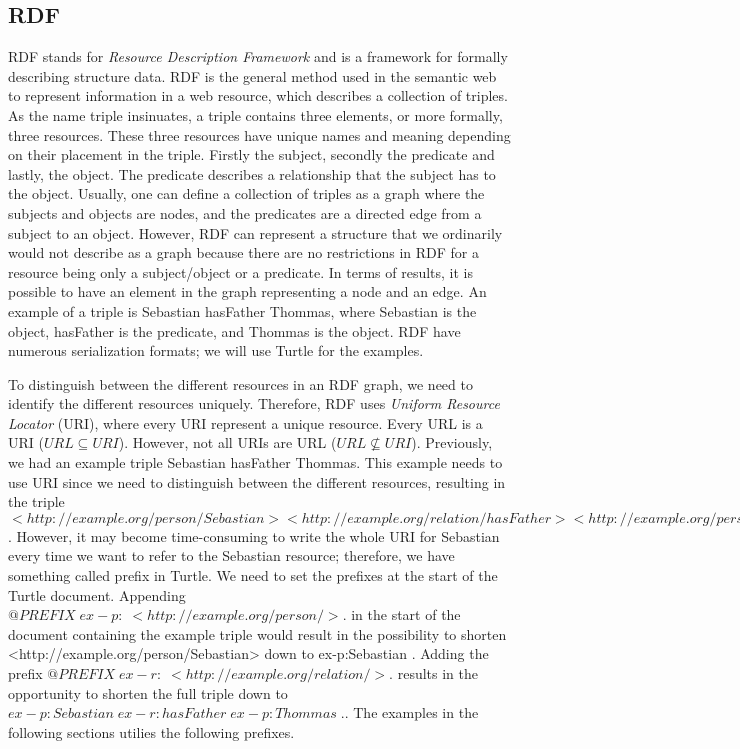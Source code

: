 \subsection{RDF}
\label{RDF}
RDF stands for \emph{Resource Description Framework} and is a framework for formally describing structure data. RDF is the general method used in the semantic web to represent information in a web resource, which describes a collection of triples. As the name triple insinuates, a triple contains three elements, or more formally, three resources. These three resources have unique names and meaning depending on their placement in the triple. Firstly the subject, secondly the predicate and lastly, the object. The predicate describes a relationship that the subject has to the object. Usually, one can define a collection of triples as a graph where the subjects and objects are nodes, and the predicates are a directed edge from a subject to an object. However, RDF can represent a structure that we ordinarily would not describe as a graph because there are no restrictions in RDF for a resource being only a subject/object or a predicate. In terms of results, it is possible to have an element in the graph representing a node and an edge. An example of a triple is Sebastian hasFather Thommas, where Sebastian is the object, hasFather is the predicate, and Thommas is the object. RDF have numerous serialization formats; we will use Turtle for the examples.  

\para
To distinguish between the different resources in an RDF graph, we need to identify the different resources uniquely. Therefore, RDF uses \emph{Uniform Resource Locator} (URI), where every URI represent a unique resource. Every URL is a URI ($URL\subseteq URI$). However, not all URIs are URL ($URL\nsubseteq URI$).  Previously, we had an example triple Sebastian hasFather Thommas. This example needs to use URI since we need to distinguish between the different resources, resulting in the triple $<http://example.org/person/Sebastian> <http://example.org/relation/hasFather> <http://example.org/person/Thommas> .$ . However, it may become time-consuming to write the whole URI for Sebastian every time we want to refer to the Sebastian resource; therefore, we have something called prefix in Turtle. We need to set the prefixes at the start of the Turtle document. Appending $@PREFIX\; ex-p:\; <http://example.org/person/>.$ in the start of the document containing the example triple would result in the possibility to shorten <http://example.org/person/Sebastian> down to ex-p:Sebastian . Adding the prefix $@PREFIX\; ex-r:\; <http://example.org/relation/>.$ results in the opportunity to shorten the full triple down to $ex-p:Sebastian\; ex-r:hasFather\; ex-p:Thommas\; .$. The examples in the following sections utilies the following prefixes.

